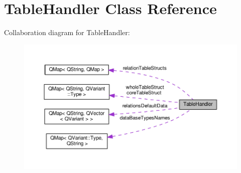 \hypertarget{class_table_handler}{}\section{Table\+Handler Class Reference}
\label{class_table_handler}


Collaboration diagram for Table\+Handler\+:\nopagebreak
\begin{figure}[H]
\begin{center}
\leavevmode
\includegraphics[width=350pt]{class_table_handler__coll__graph}
\end{center}
\end{figure}
